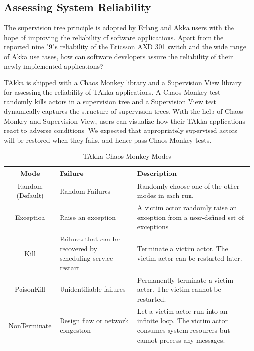 
\subsection{Assessing System Reliability}
\label{reliability}







The supervision tree principle is adopted by Erlang and Akka users with the 
hope of improving the reliability of software applications.  Apart from the 
reported nine "9"s reliability of the Ericsson AXD 301 switch 
\citep{ArmstrongAXD} and the wide range of Akka use cases, how can software 
developers assure the reliability of their newly implemented applications?  

TAkka is shipped with a Chaos Monkey library and a Supervision View library for 
assessing the reliability of TAkka applications.  A Chaos Monkey test randomly 
kills actors in a supervision tree and a Supervision View test dynamically 
captures the structure of supervision trees.  With the help of Chaos Monkey and 
Supervision View, users can visualize how their TAkka applications react to 
adverse conditions. 
We expected that appropriately supervised actors will be restored when they 
fails, and hence pass Chaos Monkey tests.

\begin{table}
\begin{tabular}{| c | p{4 cm} | p{5 cm} | }
\hline
Mode & Failure & Description \\
\hline
Random (Default) & Random Failures & Randomly choose one of the other modes in 
each run. \\
\hline
Exception & Raise an exception & A victim actor randomly raise an exception 
from 
a user-defined set of exceptions. \\
\hline
Kill & Failures that can be recovered by scheduling service restart &  
Terminate 
a victim actor.  The victim actor can be restarted later. \\
\hline
PoisonKill & Unidentifiable failures & Permanently terminate a victim actor.  
The victim cannot be restarted.  \\ 
\hline 
NonTerminate & Design flaw or network congestion & Let a victim actor run 
into an infinite loop.  The victim actor consumes system resources but cannot 
process any messages. \\
\hline

\end{tabular}
\label{chaos}
\caption{TAkka Chaos Monkey Modes}
\end{table}


